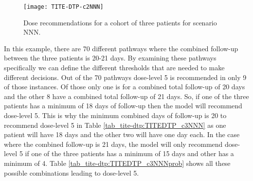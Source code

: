 \begin{figure}[H]
	\centering
	\caption{Dose recommendations for a cohort of three patients for scenario NNN.}
	\label{fig_tite-dtp:c2NNNprob}
	\texttt{[image: TITE-DTP-c2NNN]}
\end{figure}

In this example, there are 70 different pathways where the combined follow-up between the three patients is 20-21 days. By examining these pathways specifically we can define the different thresholds that are needed to make different decisions. Out of the 70 pathways dose-level 5 is recommended in only 9 of those instances. Of those only one is for a combined total follow-up of 20 days and the other 8 have a combined total follow-up of 21 days. So, if one of the three patients has a minimum of 18 days of follow-up then the model will recommend dose-level 5. This is why the minimum combined days of follow-up is 20 to recommend dose-level 5 in Table \ref{tab_tite-dtp:TITEDTP_c3NNN} as one patient will have 18 days and the other two will have one day each. In the case where the combined follow-up is 21 days, the model will only recommend dose-level 5 if one of the three patients has a minimum of 15 days and other has a minimum of 4. Table \ref{tab_tite-dtp:TITEDTP_c3NNNprob} shows all these possible combinations leading to dose-level 5. 

